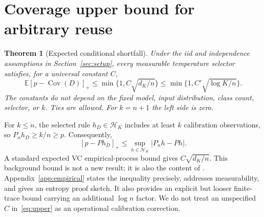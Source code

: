 \documentclass[10pt]{article}
\newtheorem{theorem}{Theorem}[section]
\theoremstyle{definition}\newtheorem{definition}[theorem]{Definition}
\theoremstyle{remark}\newtheorem{remark}[theorem]{Remark}
\newcommand{\E}{\mathbb E}
\newcommand{\1}{\mathbf 1}
\newcommand{\HH}{\mathcal H}
\newcommand{\Cov}{\operatorname{Cov}}
\newcommand{\pos}[1]{\left[#1\right]_+}
\begin{document}
\section{Coverage upper bound for arbitrary reuse}\label{sec:upper}
\begin{theorem}[Expected conditional shortfall]\label{thm:upper}
Under the iid and independence assumptions in Section~\ref{sec:setup}, every measurable temperature selector satisfies, for a universal constant $C$,
\begin{equation}\label{eq:upper}
 \E\pos{p-\Cov(D)}\le\min\{1,C\sqrt{d_K/n}\}
 \le\min\{1,C'\sqrt{\log K/n}\}.
\end{equation}
The constants do not depend on the fixed model, input distribution, class count, selector, or $k$. Ties are allowed. For $k=n+1$ the left side is zero.
\end{theorem}
For $k\le n$, the selected rule $h_D\in\HH_K$ includes at least $k$ calibration observations, so $P_nh_D\ge k/n\ge p$. Consequently,
\begin{equation}\label{eq:empirical}
 \pos{p-Ph_D}\le\sup_{h\in\HH_K}|P_nh-Ph|.
\end{equation}
A standard expected VC empirical-process bound gives $C\sqrt{d_K/n}$. This background bound is not a new result; it is also the content of \citet[Lemma D.6]{zeng2025}. Appendix~\ref{app:empirical} states the inequality precisely, addresses measurability, and gives an entropy proof sketch. It also provides an explicit but looser finite-trace bound carrying an additional $\log n$ factor. We do not treat an unspecified $C$ in~\eqref{eq:upper} as an operational calibration correction.
\end{document}
